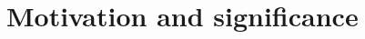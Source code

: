 \documentclass[preprint,12pt, a4paper]{elsarticle}
\begin{document}



\section{Motivation and significance}\label{sec:motivation}

\end{document}
